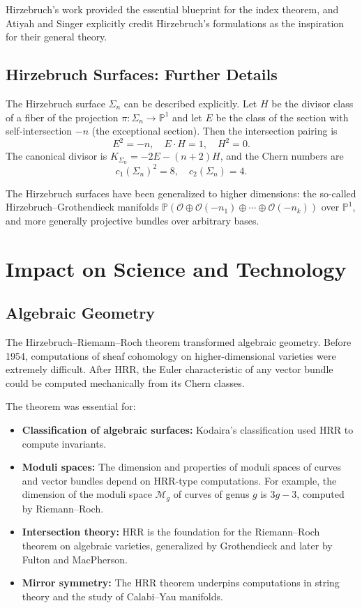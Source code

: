 Hirzebruch's work provided the essential blueprint for the index
theorem, and Atiyah and Singer explicitly credit Hirzebruch's
formulations as the inspiration for their general theory.

\subsection{Hirzebruch Surfaces: Further Details}

The Hirzebruch surface \(\Sigma_n\) can be described explicitly. Let
\(H\) be the divisor class of a fiber of the projection
\(\pi: \Sigma_n \to \mathbb{P}^1\) and let \(E\) be the class of the
section with self-intersection \(-n\) (the exceptional section). Then
the intersection pairing is
\[
E^2 = -n,\quad E \cdot H = 1,\quad H^2 = 0.
\]
The canonical divisor is \(K_{\Sigma_n} = -2E - (n+2)H\), and the Chern
numbers are
\[
c_1(\Sigma_n)^2 = 8,\quad c_2(\Sigma_n) = 4.
\]

The Hirzebruch surfaces have been generalized to higher dimensions: the
so-called Hirzebruch--Grothendieck manifolds
\(\mathbb{P}(\mathcal{O} \oplus \mathcal{O}(-n_1)
\oplus \cdots \oplus \mathcal{O}(-n_k))\) over \(\mathbb{P}^1\), and
more generally projective bundles over arbitrary bases.

\section{Impact on Science and Technology}

\subsection{Algebraic Geometry}

The Hirzebruch--Riemann--Roch theorem transformed algebraic geometry.
Before 1954, computations of sheaf cohomology on higher-dimensional
varieties were extremely difficult. After HRR, the Euler characteristic
of any vector bundle could be computed mechanically from its Chern
classes.

The theorem was essential for:
\begin{itemize}
    \item \textbf{Classification of algebraic surfaces:} Kodaira's
    classification used HRR to compute invariants.
    \item \textbf{Moduli spaces:} The dimension and properties of
    moduli spaces of curves and vector bundles depend on HRR-type
    computations. For example, the dimension of the moduli space
    \(\mathcal{M}_g\) of curves of genus \(g\) is \(3g-3\), computed by
    Riemann--Roch.
    \item \textbf{Intersection theory:} HRR is the foundation for the
    Riemann--Roch theorem on algebraic varieties, generalized by
    Grothendieck and later by Fulton and MacPherson.
    \item \textbf{Mirror symmetry:} The HRR theorem underpins
    computations in string theory and the study of Calabi--Yau
    manifolds.
\end{itemize}

